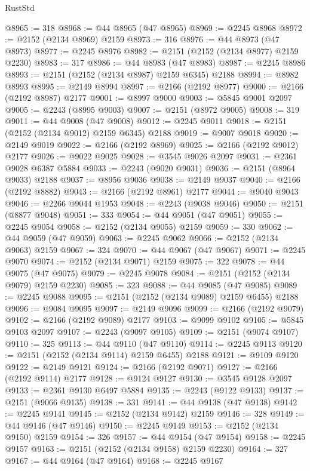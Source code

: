 \begin{lexlean}{RustStd}
\begin{coremodule}
@8965 := 318
@8968 := @44 @8965 (@47 @8965)
@8969 := @2245 @8968
@8972 := @2152 (@2134 @8969) @2159
@8973 := 316
@8976 := @44 @8973 (@47 @8973)
@8977 := @2245 @8976
@8982 := @2151 (@2152 (@2134 @8977) @2159 @2230)
@8983 := 317
@8986 := @44 @8983 (@47 @8983)
@8987 := @2245 @8986
@8993 := @2151 (@2152 (@2134 @8987) @2159 @6345) @2188
@8994 := @8982 @8993
@8995 := @2149 @8994
@8997 := @2166 (@2192 @8977)
@9000 := @2166 (@2192 @8987) @2177
@9001 := @8997 @9000
@9003 := @5845 @9001 @2097
@9005 := @2243 (@8995 @9003)
@9007 := @2151 (@8972 @9005)
@9008 := 319
@9011 := @44 @9008 (@47 @9008)
@9012 := @2245 @9011
@9018 := @2151 (@2152 (@2134 @9012) @2159 @6345) @2188
@9019 := @9007 @9018
@9020 := @2149 @9019
@9022 := @2166 (@2192 @8969)
@9025 := @2166 (@2192 @9012) @2177
@9026 := @9022 @9025
@9028 := @3545 @9026 @2097
@9031 := @2361 @9028 @6387 @5884
@9033 := @2243 (@9020 @9031)
@9036 := @2151 (@8964 @9033) @2188
@9037 := @8956 @9036
@9038 := @2149 @9037
@9040 := @2166 (@2192 @8882)
@9043 := @2166 (@2192 @8961) @2177
@9044 := @9040 @9043
@9046 := @2266 @9044 @1953
@9048 := @2243 (@9038 @9046)
@9050 := @2151 (@8877 @9048)
@9051 := 333
@9054 := @44 @9051 (@47 @9051)
@9055 := @2245 @9054
@9058 := @2152 (@2134 @9055) @2159
@9059 := 330
@9062 := @44 @9059 (@47 @9059)
@9063 := @2245 @9062
@9066 := @2152 (@2134 @9063) @2159
@9067 := 324
@9070 := @44 @9067 (@47 @9067)
@9071 := @2245 @9070
@9074 := @2152 (@2134 @9071) @2159
@9075 := 322
@9078 := @44 @9075 (@47 @9075)
@9079 := @2245 @9078
@9084 := @2151 (@2152 (@2134 @9079) @2159 @2230)
@9085 := 323
@9088 := @44 @9085 (@47 @9085)
@9089 := @2245 @9088
@9095 := @2151 (@2152 (@2134 @9089) @2159 @6455) @2188
@9096 := @9084 @9095
@9097 := @2149 @9096
@9099 := @2166 (@2192 @9079)
@9102 := @2166 (@2192 @9089) @2177
@9103 := @9099 @9102
@9105 := @5845 @9103 @2097
@9107 := @2243 (@9097 @9105)
@9109 := @2151 (@9074 @9107)
@9110 := 325
@9113 := @44 @9110 (@47 @9110)
@9114 := @2245 @9113
@9120 := @2151 (@2152 (@2134 @9114) @2159 @6455) @2188
@9121 := @9109 @9120
@9122 := @2149 @9121
@9124 := @2166 (@2192 @9071)
@9127 := @2166 (@2192 @9114) @2177
@9128 := @9124 @9127
@9130 := @3545 @9128 @2097
@9133 := @2361 @9130 @6497 @5884
@9135 := @2243 (@9122 @9133)
@9137 := @2151 (@9066 @9135)
@9138 := 331
@9141 := @44 @9138 (@47 @9138)
@9142 := @2245 @9141
@9145 := @2152 (@2134 @9142) @2159
@9146 := 328
@9149 := @44 @9146 (@47 @9146)
@9150 := @2245 @9149
@9153 := @2152 (@2134 @9150) @2159
@9154 := 326
@9157 := @44 @9154 (@47 @9154)
@9158 := @2245 @9157
@9163 := @2151 (@2152 (@2134 @9158) @2159 @2230)
@9164 := 327
@9167 := @44 @9164 (@47 @9164)
@9168 := @2245 @9167

\end{coremodule}
\end{lexlean}
